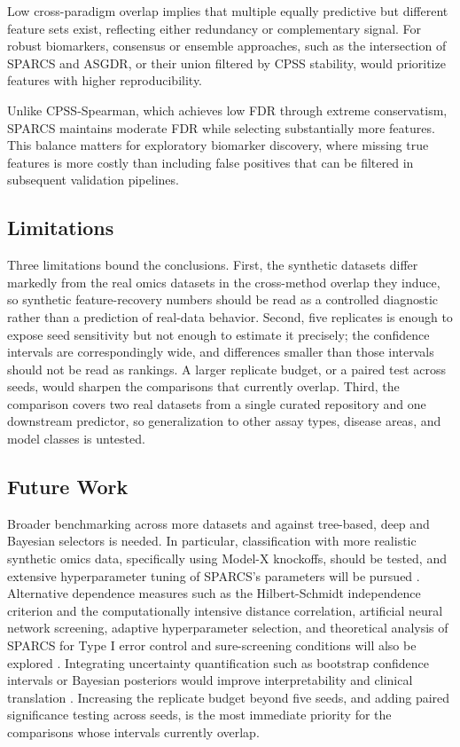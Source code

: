 \documentclass[11pt]{article}
\begin{document}
Low cross-paradigm overlap implies that multiple equally predictive but different feature sets exist,
reflecting either redundancy or complementary signal. For robust biomarkers, consensus or ensemble
approaches, such as the intersection of SPARCS and ASGDR, or their union filtered by CPSS stability,
would prioritize features with higher reproducibility.

Unlike CPSS-Spearman, which achieves low FDR through extreme conservatism, SPARCS maintains moderate
FDR while selecting substantially more features. This balance matters for exploratory biomarker
discovery, where missing true features is more costly than including false positives that can be
filtered in subsequent validation pipelines.

\subsection{Limitations}

Three limitations bound the conclusions. First, the synthetic datasets differ markedly from the real
omics datasets in the cross-method overlap they induce, so synthetic feature-recovery numbers should
be read as a controlled diagnostic rather than a prediction of real-data behavior. Second, five replicates is enough to expose seed sensitivity but not enough to
estimate it precisely; the confidence intervals are correspondingly wide, and differences smaller
than those intervals should not be read as rankings. A larger replicate budget, or a paired test
across seeds, would sharpen the comparisons that currently overlap. Third, the comparison covers two real datasets from a single curated repository and
one downstream predictor, so generalization to other assay types, disease areas, and model classes is
untested.

\subsection{Future Work}

Broader benchmarking across more datasets and against tree-based, deep and Bayesian selectors is
needed. In particular, classification with more realistic synthetic omics data, specifically using
Model-X knockoffs, should be tested, and extensive hyperparameter tuning of SPARCS's parameters will
be pursued \citep{zhou2025}. Alternative dependence measures such as the Hilbert-Schmidt independence
criterion and the computationally intensive distance correlation, artificial neural network
screening, adaptive hyperparameter selection, and theoretical analysis of SPARCS for Type I error
control and sure-screening conditions will also be explored \citep{gretton2005,hou2022}. Integrating
uncertainty quantification such as bootstrap confidence intervals or Bayesian posteriors would
improve interpretability and clinical translation \citep{justus2024}. Increasing the replicate budget beyond five seeds, and adding paired
significance testing across seeds, is the most immediate priority for the comparisons whose
intervals currently overlap.
\end{document}
